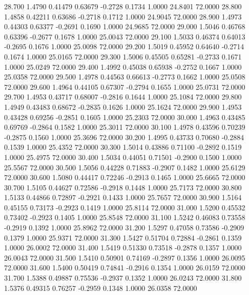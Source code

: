   28.700   1.4790   0.41479   0.63679  -0.2728   0.1734   1.0000  24.8401  72.0000
  28.800   1.4858   0.42211   0.63686  -0.2718   0.1712   1.0000  24.9045  72.0000
  28.900   1.4973   0.44303   0.63377  -0.2691   0.1690   1.0000  24.9685  72.0000
  29.000   1.5046   0.46768   0.63396  -0.2677   0.1678   1.0000  25.0043  72.0000
  29.100   1.5033   0.46374   0.64013  -0.2695   0.1676   1.0000  25.0098  72.0000
  29.200   1.5019   0.45952   0.64640  -0.2714   0.1674   1.0000  25.0165  72.0000
  29.300   1.5006   0.45505   0.65281  -0.2733   0.1671   1.0000  25.0249  72.0000
  29.400   1.4992   0.45038   0.65938  -0.2752   0.1667   1.0000  25.0358  72.0000
  29.500   1.4978   0.44563   0.66613  -0.2773   0.1662   1.0000  25.0508  72.0000
  29.600   1.4964   0.44105   0.67307  -0.2794   0.1655   1.0000  25.0731  72.0000
  29.700   1.4953   0.43717   0.68007  -0.2816   0.1644   1.0000  25.1084  72.0000
  29.800   1.4949   0.43483   0.68672  -0.2835   0.1626   1.0000  25.1624  72.0000
  29.900   1.4953   0.43428   0.69256  -0.2851   0.1605   1.0000  25.2303  72.0000
  30.000   1.4963   0.43485   0.69769  -0.2864   0.1582   1.0000  25.3011  72.0000
  30.100   1.4978   0.43596   0.70239  -0.2875   0.1560   1.0000  25.3696  72.0000
  30.200   1.4995   0.43733   0.70680  -0.2884   0.1539   1.0000  25.4352  72.0000
  30.300   1.5014   0.43886   0.71100  -0.2892   0.1519   1.0000  25.4975  72.0000
  30.400   1.5034   0.44051   0.71501  -0.2900   0.1500   1.0000  25.5567  72.0000
  30.500   1.5056   0.44228   0.71883  -0.2907   0.1482   1.0000  25.6129  72.0000
  30.600   1.5080   0.44417   0.72246  -0.2913   0.1465   1.0000  25.6665  72.0000
  30.700   1.5105   0.44627   0.72586  -0.2918   0.1448   1.0000  25.7173  72.0000
  30.800   1.5133   0.44866   0.72897  -0.2921   0.1433   1.0000  25.7657  72.0000
  30.900   1.5164   0.45155   0.73173  -0.2923   0.1419   1.0000  25.8114  72.0000
  31.000   1.5200   0.45532   0.73402  -0.2923   0.1405   1.0000  25.8548  72.0000
  31.100   1.5242   0.46083   0.73558  -0.2919   0.1392   1.0000  25.8962  72.0000
  31.200   1.5297   0.47058   0.73586  -0.2909   0.1379   1.0000  25.9371  72.0000
  31.300   1.5427   0.51704   0.72884  -0.2861   0.1359   1.0000  26.0002  72.0000
  31.400   1.5419   0.51330   0.73518  -0.2878   0.1357   1.0000  26.0043  72.0000
  31.500   1.5410   0.50901   0.74169  -0.2897   0.1356   1.0000  26.0095  72.0000
  31.600   1.5400   0.50419   0.74841  -0.2916   0.1354   1.0000  26.0159  72.0000
  31.700   1.5388   0.49887   0.75536  -0.2937   0.1352   1.0000  26.0243  72.0000
  31.800   1.5376   0.49315   0.76257  -0.2959   0.1348   1.0000  26.0358  72.0000
